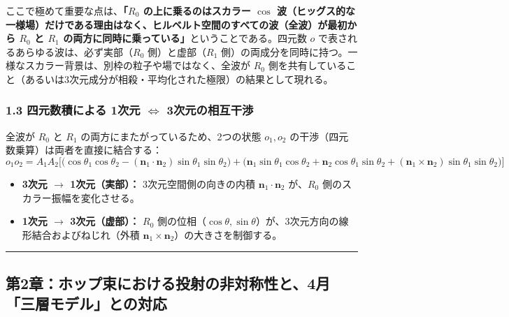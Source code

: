 \documentclass[
  a4paper,
]{ltjsarticle}
\providecommand{\tightlist}{%
  \setlength{\itemsep}{0pt}\setlength{\parskip}{0pt}}
\begin{document}
ここで極めて重要な点は、\textbf{「\(R_0\) の上に乗るのはスカラー
\(\cos\)
波（ヒッグス的な一様場）だけである理由はなく、ヒルベルト空間のすべての波（全波）が最初から
\(R_0\) と \(R_1\) の両方に同時に乗っている」}ということである。四元数
\(o\) で表されるあらゆる波は、必ず実部（\(R_0\) 側）と虚部（\(R_1\)
側）の両成分を同時に持つ。一様なスカラー背景は、別枠の粒子や場ではなく、全波が
\(R_0\)
側を共有していること（あるいは3次元成分が相殺・平均化された極限）の結果として現れる。

\subsubsection{\texorpdfstring{1.3 四元数積による 1次元
\(\Leftrightarrow\)
3次元の相互干渉}{1.3 四元数積による 1次元 \textbackslash Leftrightarrow 3次元の相互干渉}}\label{ux56dbux5143ux6570ux7a4dux306bux3088ux308b-1ux6b21ux5143-leftrightarrow-3ux6b21ux5143ux306eux76f8ux4e92ux5e72ux6e09}

全波が \(R_0\) と \(R_1\) の両方にまたがっているため、2つの状態
\(o_1, o_2\) の干渉（四元数乗算）は両者を直接に結合する：
\[o_1 o_2 = A_1 A_2 \Big[ \big(\cos\theta_1\cos\theta_2 - (\mathbf{n}_1\cdot\mathbf{n}_2)\sin\theta_1\sin\theta_2\big) + \big(\mathbf{n}_1\sin\theta_1\cos\theta_2 + \mathbf{n}_2\cos\theta_1\sin\theta_2 + (\mathbf{n}_1\times\mathbf{n}_2)\sin\theta_1\sin\theta_2\big) \Big]\]

\begin{itemize}
\tightlist
\item
  \textbf{3次元 \(\to\) 1次元（実部）：} 3次元空間側の向きの内積
  \(\mathbf{n}_1 \cdot \mathbf{n}_2\) が、\(R_0\)
  側のスカラー振幅を変化させる。
\item
  \textbf{1次元 \(\to\) 3次元（虚部）：} \(R_0\)
  側の位相（\(\cos\theta, \sin\theta\)）が、3次元方向の線形結合およびねじれ（外積
  \(\mathbf{n}_1 \times \mathbf{n}_2\)）の大きさを制御する。
\end{itemize}

\begin{center}\rule{0.5\linewidth}{0.5pt}\end{center}

\subsection{第2章：ホップ束における投射の非対称性と、4月「三層モデル」との対応}\label{ux7b2c2ux7ae0ux30dbux30c3ux30d7ux675fux306bux304aux3051ux308bux6295ux5c04ux306eux975eux5bfeux79f0ux6027ux30684ux6708ux4e09ux5c64ux30e2ux30c7ux30ebux3068ux306eux5bfeux5fdc}
\end{document}
